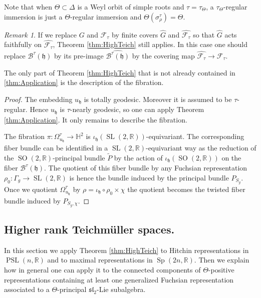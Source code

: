 \documentclass[reqno,10pt]{amsart}
\theoremstyle{plain}
\theoremstyle{definition}
\theoremstyle{remark}
\newtheorem{rem}[thm]{Remark}
\newcommand{\type}{\tau}
\newcommand{\R}{\mathbb{R}}
\DeclareMathOperator{\PSL}{PSL}
\DeclareMathOperator{\SL}{SL}
\DeclareMathOperator{\SO}{SO}
\DeclareMathOperator{\Sp}{Sp}
\begin{document}
Note that when $\Theta\subset \Delta$ is a Weyl orbit of simple roots and $\type=\type_\Theta$, a $\type_\Theta$-regular immersion is just a $\Theta$-regular immersion and $\Theta(\sigma^\type_\rho)=\Theta$.

\begin{rem}
If we replace $G$ and $\mathcal{F}_\type$ by finite covers $\widehat{G}$ and $\widehat{\mathcal{F}_\type}$  so that $\widehat{G}$ acts faithfully on $\widehat{\mathcal{F}_\type}$, Theorem \ref{thm:HighTeich} still applies. In this case one should replace $\mathcal{B}^\type(\mathfrak{h})$ by its pre-image $\widehat{\mathcal{B}^\type(\mathfrak{h})}$ by the covering map $\widehat{\mathcal{F}_\type}\to \mathcal{F}_\type$.
\end{rem}

The only part of Theorem \ref{thm:HighTeich} that is not already contained in \ref{thm:Application} is the description of the fibration.

\medskip

\begin{proof}

The embedding $u_\mathfrak{h}$ is totally geodesic. Moreover it is assumed to be $\type$-regular. Hence $u_\mathfrak{h}$ is $\type$-nearly geodesic, so one can apply Theorem \ref{thm:Application}. It only remains to describe the fibration.

\medskip
 The fibration $\pi:\Omega_{u_\mathfrak{h}}^\type\to \mathbb{H}^2$ is $\iota_\mathfrak{h}\left(\SL(2,\R)\right)$-equivariant. The corresponding fiber bundle can be identified in a $\SL(2,\R)$-equivariant way as the reduction of the $\SO(2,\R)$-principal bundle $\widetilde{P}$ by the action of $\iota_\mathfrak{h}\left(\SO(2,\R)\right)$ on the fiber $\mathcal{B}^\type(\mathfrak{h})$. The quotient of this fiber bundle by any Fuchsian representation $\rho_0:\Gamma_g\to \SL(2,\R)$ is hence the bundle induced by the principal bundle $P_{S_g}$.
Once we quotient $\Omega_{u_\mathfrak{h}}^\type$ by $\rho=\iota_\mathfrak{h}\circ \rho_0 \times \chi$ the quotient becomes the twisted fiber bundle induced by $P_{S_g,\chi}$.
\end{proof}

\subsection{Higher rank Teichmüller spaces.}
\label{subsec:ThetaPositive}

In this section we apply Theorem \ref{thm:HighTeich} to Hitchin representations in $\PSL(n,\R)$ and to maximal representations in $\Sp(2n,\R)$. Then we explain how in general one can apply it to the connected components of $\Theta$-positive representations containing at least one generalized Fuchsian representation associated to a $\Theta$-principal $\mathfrak{sl}_2$-Lie subalgebra. 
\end{document}
